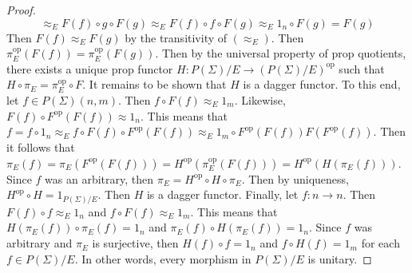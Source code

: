 \begin{proof}
\begin{equation*}
        \approx_E
        F( f ) \circ g \circ F( g )
        \approx_E
        F( f ) \circ f \circ F( g )
        \approx_E
        1_n \circ F( g )
        =
        F( g )
    \end{equation*}
    Then $F( f ) \approx_E F( g )$ by the transitivity of $( \approx_E )$.
    Then $\pi_E^\text{op}( F( f ) ) = \pi_E^{\text{op}}( F( g ) )$.
    Then by the universal property of prop quotients, there exists a unique prop functor $H: P( \Sigma ) / E \to ( P( \Sigma ) / E )^\text{op}$ such that $H \circ \pi_E = \pi_E^\text{op} \circ F$.
    It remains to be shown that $H$ is a dagger functor.
    To this end, let $f \in P( \Sigma )( n, m )$.
    Then $f \circ F( f ) \approx_E 1_m$.
    Likewise, $F( f ) \circ F^\text{op}( F( f ) ) \approx 1_n$.
    This means that $f = f \circ 1_n \approx_E f \circ F( f ) \circ F^\text{op}( F( f ) ) \approx_E 1_m \circ F^\text{op}( F( f ) ) F( F^\text{op}( f ) )$.
    Then it follows that $\pi_E( f ) = \pi_E( F^\text{op}( F( f ) ) ) = H^\text{op}( \pi_E^\text{op}( F( f ) ) ) = H^\text{op}( H( \pi_E( f ) ) )$.
    Since $f$ was an arbitrary, then $\pi_E = H^\text{op} \circ H \circ \pi_E$.
    Then by uniqueness, $H^\text{op} \circ H = 1_{P( \Sigma ) / E}$.
    Then $H$ is a dagger functor.
    Finally, let $f: n \to n$.
    Then $F( f ) \circ f \approx_E 1_n$ and $f \circ F( f ) \approx_E 1_m$.
    This means that $H( \pi_E( f ) ) \circ \pi_E( f ) = 1_n$ and $\pi_E( f ) \circ H( \pi_E( f ) ) = 1_n$.
    Since $f$ was arbitrary and $\pi_E$ is surjective, then $H( f ) \circ f = 1_n$ and $f \circ H( f ) = 1_m$ for each $f \in P( \Sigma ) / E$.
    In other words, every morphism in $P( \Sigma ) / E$ is unitary.
\end{proof}